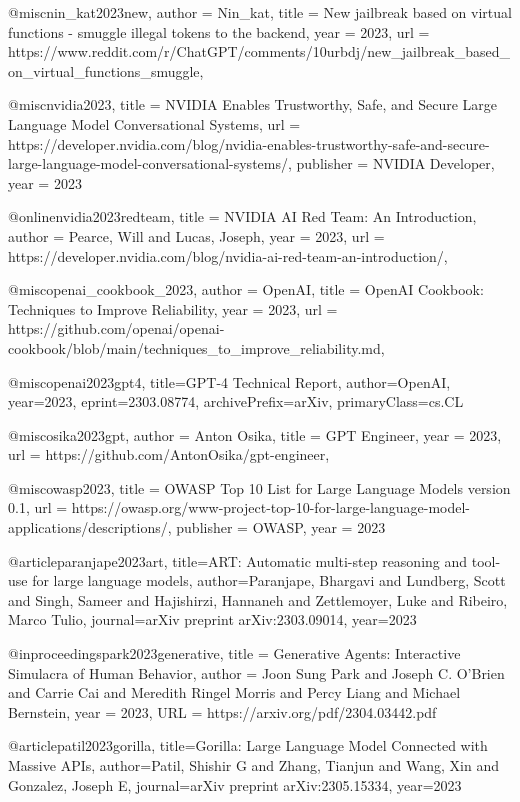 @misc{nin_kat2023new,
    author = {Nin_kat},
    title = {New jailbreak based on virtual functions - smuggle illegal tokens to the backend},
    year = {2023},
    url = {https://www.reddit.com/r/ChatGPT/comments/10urbdj/new_jailbreak_based_on_virtual_functions_smuggle},
}

@misc{nvidia2023,
  title = {NVIDIA Enables Trustworthy, Safe, and Secure Large Language Model Conversational Systems},
  url = {https://developer.nvidia.com/blog/nvidia-enables-trustworthy-safe-and-secure-large-language-model-conversational-systems/},
  publisher = {NVIDIA Developer},
  year = {2023}
}

@online{nvidia2023redteam,
  title = {NVIDIA AI Red Team: An Introduction},
  author = {Pearce, Will and Lucas, Joseph},
  year = {2023},
  url = {https://developer.nvidia.com/blog/nvidia-ai-red-team-an-introduction/},
}

@misc{openai_cookbook_2023,
  author = {OpenAI},
  title = {OpenAI Cookbook: Techniques to Improve Reliability},
  year = {2023},
  url = {https://github.com/openai/openai-cookbook/blob/main/techniques_to_improve_reliability.md},
}

@misc{openai2023gpt4,
      title={GPT-4 Technical Report},
      author={OpenAI},
      year={2023},
      eprint={2303.08774},
      archivePrefix={arXiv},
      primaryClass={cs.CL}
}

@misc{osika2023gpt,
  author = {Anton Osika},
  title = {GPT Engineer},
  year = {2023},
  url = {https://github.com/AntonOsika/gpt-engineer},
}

@misc{owasp2023,
  title = {OWASP Top 10 List for Large Language Models version 0.1},
  url = {https://owasp.org/www-project-top-10-for-large-language-model-applications/descriptions/},
  publisher = {OWASP},
  year = {2023}
}

@article{paranjape2023art,
  title={ART: Automatic multi-step reasoning and tool-use for large language models},
  author={Paranjape, Bhargavi and Lundberg, Scott and Singh, Sameer and Hajishirzi, Hannaneh and Zettlemoyer, Luke and Ribeiro, Marco Tulio},
  journal={arXiv preprint arXiv:2303.09014},
  year={2023}
}

@inproceedings{park2023generative,
title	= {Generative Agents: Interactive Simulacra of Human Behavior},
author	= {Joon Sung Park and Joseph C. O'Brien and Carrie Cai and Meredith Ringel Morris and Percy Liang and Michael Bernstein},
year	= {2023},
URL	= {https://arxiv.org/pdf/2304.03442.pdf}
}

@article{patil2023gorilla,
  title={Gorilla: Large Language Model Connected with Massive APIs},
  author={Patil, Shishir G and Zhang, Tianjun and Wang, Xin and Gonzalez, Joseph E},
  journal={arXiv preprint arXiv:2305.15334},
  year={2023}
}

